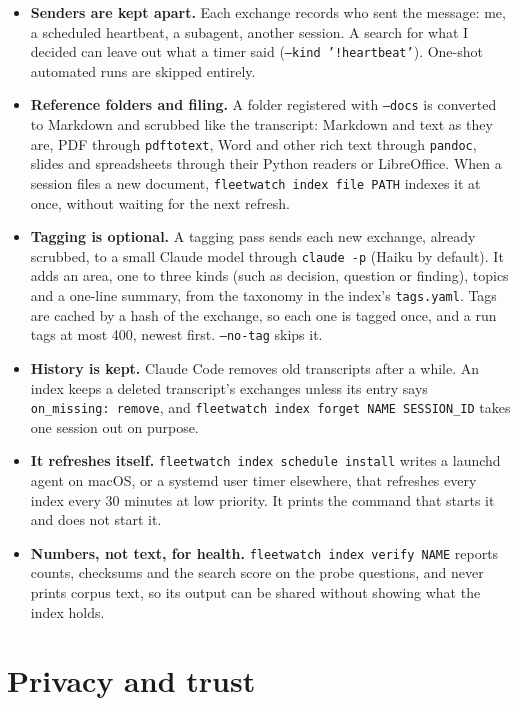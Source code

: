 \documentclass[11pt, letterpaper]{article}
\newcommand{\cmd}[1]{\texttt{#1}}
\begin{document}
\begin{itemize}
  \item \textbf{Senders are kept apart.} Each exchange records who sent the message: me, a
    scheduled heartbeat, a subagent, another session. A search for what I decided can leave
    out what a timer said (\cmd{--kind '!heartbeat'}). One-shot automated runs are skipped
    entirely.
  \item \textbf{Reference folders and filing.} A folder registered with \cmd{--docs} is
    converted to Markdown and scrubbed like the transcript: Markdown and text as they are, PDF
    through \cmd{pdftotext}, Word and other rich text through \cmd{pandoc}, slides and
    spreadsheets through their Python readers or LibreOffice. When a session files a new
    document, \cmd{fleetwatch index file PATH} indexes it at once, without waiting for the
    next refresh.
  \item \textbf{Tagging is optional.} A tagging pass sends each new exchange, already
    scrubbed, to a small Claude model through \cmd{claude -p} (Haiku by default). It adds an
    area, one to three kinds (such as decision, question or finding), topics and a one-line
    summary, from the taxonomy in the index's \cmd{tags.yaml}. Tags are cached by a hash of
    the exchange, so each one is tagged once, and a run tags at most 400, newest first.
    \cmd{--no-tag} skips it.
  \item \textbf{History is kept.} Claude Code removes old transcripts after a while. An index
    keeps a deleted transcript's exchanges unless its entry says \cmd{on\_missing: remove},
    and \cmd{fleetwatch index forget NAME SESSION\_ID} takes one session out on purpose.
  \item \textbf{It refreshes itself.} \cmd{fleetwatch index schedule install} writes a
    launchd agent on macOS, or a systemd user timer elsewhere, that refreshes every index
    every 30 minutes at low priority. It prints the command that starts it and does not
    start it.
  \item \textbf{Numbers, not text, for health.} \cmd{fleetwatch index verify NAME} reports
    counts, checksums and the search score on the probe questions, and never prints corpus
    text, so its output can be shared without showing what the index holds.
\end{itemize}

\section{Privacy and trust}
\end{document}
